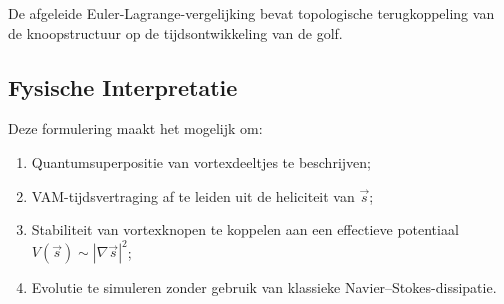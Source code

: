 De afgeleide Euler-Lagrange-vergelijking bevat topologische terugkoppeling van de knoopstructuur op de tijdsontwikkeling van de golf.

\subsection{Fysische Interpretatie}

Deze formulering maakt het mogelijk om:
\begin{enumerate}
    \item Quantumsuperpositie van vortexdeeltjes te beschrijven;
    \item VAM-tijdsvertraging af te leiden uit de heliciteit van $\vec{s}$;
    \item Stabiliteit van vortexknopen te koppelen aan een effectieve potentiaal \( V(\vec{s}) \sim |\nabla \vec{s}|^2 \);
    \item Evolutie te simuleren zonder gebruik van klassieke Navier–Stokes-dissipatie.
\end{enumerate}
